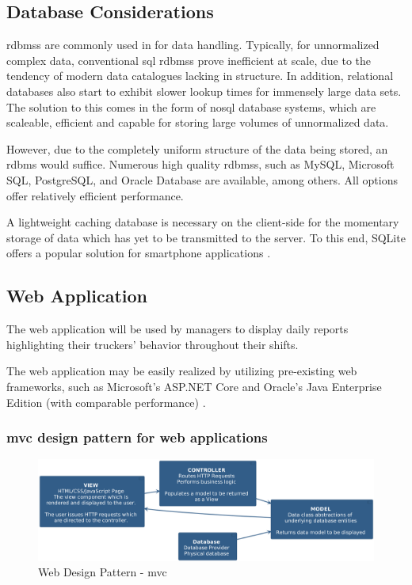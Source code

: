 \subsection{Database Considerations}
\ac{rdbms}s are commonly used in for data handling.
Typically, for unnormalized complex data, conventional \ac{sql} \ac{rdbms}s prove inefficient at scale, due to the tendency of modern data catalogues lacking in structure.
In addition, relational databases also start to exhibit slower lookup times for immensely large data sets.
The solution to this comes in the form of \ac{nosql} database systems, which are scaleable, efficient and capable for storing large volumes of unnormalized data. \cite{gupta2017nosql} \cite{qader2018comparative} \cite{ongo2018hybrid}

However, due to the completely uniform structure of the data being stored, an \ac{rdbms} would suffice.
Numerous high quality \ac{rdbms}s, such as MySQL, Microsoft SQL, PostgreSQL, and Oracle Database are available, among others. All options offer relatively efficient performance.
\cite{truskowski2020comparison}

A lightweight caching database is necessary on the client-side for the momentary storage of data which has yet to be transmitted to the server. To this end, SQLite offers a popular solution for smartphone applications \cite{bhosale2015sqlite}.

\subsection{Web Application}
The web application will be used by managers to display daily reports highlighting their truckers' behavior throughout their shifts.

The web application may be easily realized by utilizing pre-existing web frameworks, such as Microsoft's ASP.NET Core and Oracle's Java Enterprise Edition (with comparable performance) \cite{kronis2018performance}.

\subsubsection{\Ac{mvc} design pattern for web applications}
\begin{figure}
\centering
\includegraphics[width=6in]{../diag/mvc_layout.png}
\caption{Web Design Pattern - \ac{mvc}}
\label{fig:mvc_layout}
\end{figure}

